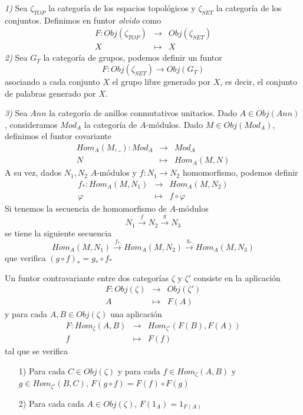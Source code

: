 \documentclass[../main.tex]{subfiles}
\begin{document}
\begin{example}
\textit{1)} Sea $\zeta_{TOP}$ la categoría de los espacios topológicos y $\zeta_{SET}$ la categoría de los conjuntos. Definimos en funtor \textit{olvido} como
$$\begin{array}{rcl}
    F: Obj(\zeta_{TOP})&\longrightarrow&Obj(\zeta_{SET})\\
    X&\longmapsto&X
    \end{array}$$
\textit{2)} Sea $G_T$ la categoría de grupos, podemos definir un funtor$$F:Obj(\zeta_{SET})\longrightarrow Obj(G_T)$$ asociando a cada conjunto $X$ el grupo libre generado por $X$, es decir, el conjunto de palabras generado por $X$.

\textit{3)} Sea $Ann$ la categoría de anillos conmutativos unitarios. Dado $A\in Obj(Ann)$, consideramos $Mod_A$ la categoría de $A$-módulos. Dado $M\in Obj(Mod_A)$, definimos el funtor covariante
$$\begin{array}{rcl}
    Hom_A(M,\_):Mod_A&\longrightarrow&Mod_A\\
    N&\longmapsto&Hom_A(M,N)
    \end{array}$$
A su vez, dados $N_1, N_2$ $A$-módulos y $f:N_1\rightarrow N_2$ homomorfismo, podemos definir
$$\begin{array}{rcl}
    f_{\ast}:Hom_A(M,N_1)&\longrightarrow&Hom_A(M,N_2)\\
    \varphi&\longmapsto&f\circ\varphi
    \end{array}$$
Si tenemos la secuencia de homomorfismo de $A$-módulos $$N_1\overset{f}{\longrightarrow}N_2\overset{g}{\longrightarrow}N_3$$
se tiene la siguiente secuencia $$Hom_A(M,N_1)\overset{f_{\ast}}{\longrightarrow}Hom_A(M,N_2)\overset{g_{\ast}}{\longrightarrow}Hom_A(M,N_3)$$ que verifica $(g\circ f)_{\ast}=g_{\ast}\circ f_{\ast}$
\end{example}
\begin{definition} Un funtor contravariante entre dos categorías $\zeta$ y $\zeta '$ consiste en la aplicación
 $$\begin{array}{rcl}
    F: Obj(\zeta)&\longrightarrow&Obj(\zeta ')\\
    A&\longmapsto&F(A)
    \end{array}$$
y para cada $A,B\in Obj(\zeta)$ una aplicación
$$\begin{array}{rcl}
    F: Hom_{\zeta}(A,B)&\longrightarrow&Hom_{\zeta '}(F(B),F(A))\\
    f&\longmapsto&F(f)
    \end{array}$$
tal que se verifica \begin{itemize}
    \item [1)] Para cada $C\in Obj(\zeta)$ y para cada $f\in Hom_{\zeta}(A,B)$ y $g\in Hom_{\zeta '}(B,C)$, $F(g\circ f)=F(f)\circ F(g)$
    \item [2)] Para cada cada $A\in Obj(\zeta)$, $F(1_A)=1_{F(A)}$
\end{itemize}
\end{definition}
\end{document}
